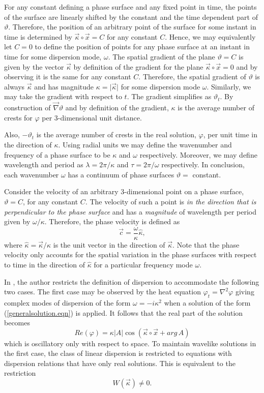 \documentclass[12pt]{article}
\theoremstyle{definition}
\numberwithin{equation}{section}
\begin{document}
{For any constant defining a phase surface and any fixed point in time, the points of the surface are linearly shifted by the constant and the time dependent part of $\vartheta$. Therefore, the position of an arbitrary point of the surface for some instant in time is determined by $\vec{\kappa}\circ\vec{x}=C$ for any constant $C$. Hence, we may equivalently let $C=0$ to define the position of points for any phase surface at an instant in time for some dispersion mode, $\omega$. The spatial gradient of the plane $\vartheta=C$ is given by the vector $\vec{\kappa}$ by definition of the gradient for the plane $\vec{\kappa}\circ\vec{x}=0$ and by observing it is the same for any constant $C$. Therefore, the spatial gradient of $\vartheta$ is always $\vec{\kappa}$ and has magnitude $\kappa=\vert\vec{\kappa}\vert$ for some dispersion mode $\omega$. Similarly, we may take the gradient with respect to $t$. The gradient simplifies as $\vartheta_t$. By construction of $\vec{\nabla}\vartheta$ and by definition of the gradient, $\kappa$ is the average number of crests for $\varphi$ per 3-dimensional unit distance.

Also, $-\vartheta_t$ is the average number of crests in the real solution, $\varphi$, per unit time in the direction of $\kappa$. Using radial units we may define the wavenumber and frequency of a phase surface to be $\kappa$ and $\omega$ respectively. Moreover, we may define wavelength and period as $\lambda=2\pi\slash\kappa$ and $\tau=2\pi\slash\omega$ respectively. In conclusion, each wavenumber $\omega$ has a continuum of phase surfaces $\vartheta=$ constant.

Consider the velocity of an arbitrary 3-dimensional point on a phase surface, $\vartheta=C$, for any constant $C$. The velocity of such a point is \textit{in the direction that is perpendicular to the phase surface} and has a \textit{magnitude} of wavelength per period given by $\omega\slash\kappa$. Therefore, the phase velocity is defined as
$$\vec{c}=\frac{\omega}{\kappa}\hat{\kappa},$$
where $\hat{\kappa}=\vec{\kappa}\slash\kappa$ is the unit vector  in the direction of $\vec{\kappa}$. Note that the phase velocity only accounts for the spatial variation in the phase surfaces with respect to time in the direction of $\hat{\kappa}$ for a particular frequency mode $\omega$.

In \cite{Whitham}, the author restricts the definition of dispersion to accommodate the following two cases. The first case may be observed by the heat equation $\varphi_t=\nabla^2\varphi$ giving complex modes of dispersion of the form $\omega=-i\kappa^2$ when a solution of the form (\ref{generalsolution.eqn}) is applied. It follows that the real part of the solution becomes $$Re(\varphi)=\kappa\vert A\vert\cos(\vec{\kappa}\circ\vec{x}+ arg\,A)$$ which is oscillatory only with respect to space. To maintain wavelike solutions in the first case, the class of linear dispersion is restricted to equations with dispersion relations that have only real solutions. This is equivalent to the restriction
$$W(\vec{\kappa})\neq 0.$$

}
\end{document}
